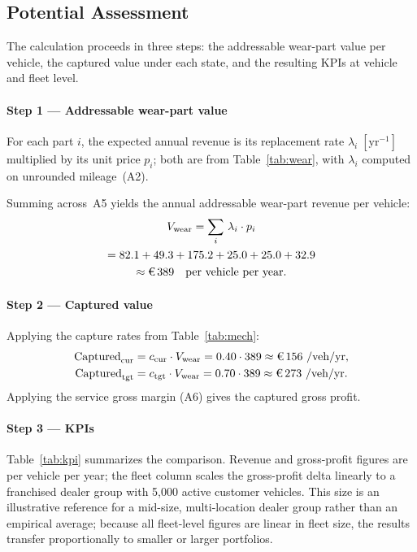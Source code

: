 \documentclass[conference,a4paper]{IEEEtran}
\newcommand{\eur}{\ifmmode\text{\texteuro}\else\texteuro\fi}
\newcommand{\cIst}{c_{\mathrm{cur}}}
\newcommand{\cSoll}{c_{\mathrm{tgt}}}
\begin{document}
\subsection{Potential Assessment}

The calculation proceeds in three steps: the addressable wear-part value per
vehicle, the captured value under each state, and the resulting KPIs at vehicle and
fleet level.
 
\paragraph*{Step 1 --- Addressable wear-part value}
For each part $i$, the expected annual revenue is its replacement rate
$\lambda_i\;[\mathrm{yr}^{-1}]$ multiplied by its unit price $p_i$; both are
from Table~\ref{tab:wear}, with $\lambda_i$ computed on unrounded mileage~(A2).

Summing across~A5 yields the annual addressable wear-part revenue per vehicle:
\begin{gather*}
V_{\mathrm{wear}} = \sum_{i}\,\lambda_i \cdot p_i \\
= 82.1 + 49.3 + 175.2 + 25.0 + 25.0 + 32.9 \\
\approx \eur\,389 \quad \text{per vehicle per year.}
\end{gather*}
 
\paragraph*{Step 2 --- Captured value}
Applying the capture rates from Table~\ref{tab:mech}:
\begin{align*}
\text{Captured}_{\mathrm{cur}} &= \cIst  \cdot V_{\mathrm{wear}} = 0.40 \cdot 389 \approx \eur\,156~\text{/veh/yr,} \\
\text{Captured}_{\mathrm{tgt}} &= \cSoll \cdot V_{\mathrm{wear}} = 0.70 \cdot 389 \approx \eur\,273~\text{/veh/yr.}
\end{align*}
Applying the service gross margin (A6) gives the captured gross profit.
 
\paragraph*{Step 3 --- KPIs}
Table~\ref{tab:kpi} summarizes the comparison. Revenue and gross-profit figures
are per vehicle per year; the fleet column scales the gross-profit delta
linearly to a franchised dealer group with 5{,}000 active customer
vehicles. This size is an illustrative reference for a mid-size,
multi-location dealer group rather than an empirical average; because all
fleet-level figures are linear in fleet size, the results transfer
proportionally to smaller or larger portfolios.
 
\end{document}
